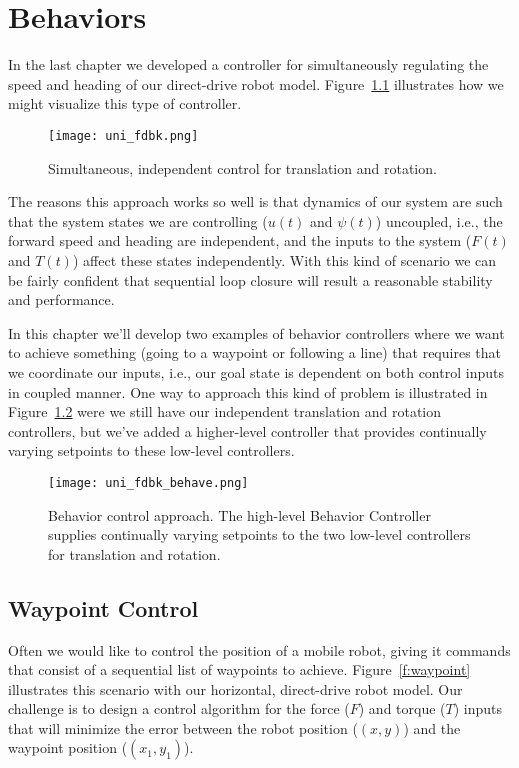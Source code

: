 \chapter{Behaviors}\label{c:behave}
In the last chapter we developed a controller for simultaneously regulating the speed and heading of our direct-drive robot model.  Figure~\ref{f:uni_fdbk} illustrates how we might visualize this type of controller.
\begin{figure}[hbt]
\centering
\texttt{[image: uni\_fdbk.png]}
\caption{Simultaneous, independent control for translation and rotation.}
\label{f:uni_fdbk}
\end{figure}
The reasons this approach works so well is that dynamics of our system are such that the system states we are controlling ($u(t)$ and $\psi(t)$) uncoupled, i.e., the forward speed and heading are independent, and the inputs to the system ($F(t)$ and $T(t)$) affect these states independently.  With this kind of scenario we can be fairly confident that sequential loop closure will result a reasonable stability and performance.

In this chapter we'll develop two examples of behavior controllers where we want to achieve something (going to a waypoint or following a line) that requires that we coordinate our inputs, i.e., our goal state is dependent on both control inputs in coupled manner.  One way to approach this kind of problem is illustrated in Figure~\ref{f:uni_fdbk_behave} were we still have our independent translation and rotation controllers, but we've added a higher-level controller that provides continually varying setpoints to these low-level controllers.
\begin{figure}[hbt]
\centering
\texttt{[image: uni\_fdbk\_behave.png]}
\caption{Behavior control approach.  The high-level Behavior Controller supplies continually varying setpoints to the two low-level controllers for translation and rotation.}
\label{f:uni_fdbk_behave}
\end{figure}

\section{Waypoint Control}
Often we would like to control the position of a mobile robot, giving it commands that consist of a sequential list of waypoints to achieve.  Figure~\ref{f:waypoint} illustrates this scenario with our horizontal, direct-drive robot model.  Our challenge is to design a control algorithm for the force ($F$) and torque ($T$) inputs that will minimize the error between the robot position ($(x,y)$) and the waypoint position ($(x_1,y_1)$).  


